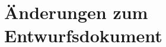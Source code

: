 \documentclass{article}
\begin{document}
	\section{Änderungen zum Entwurfsdokument}
	
	
	
	
\end{document}
